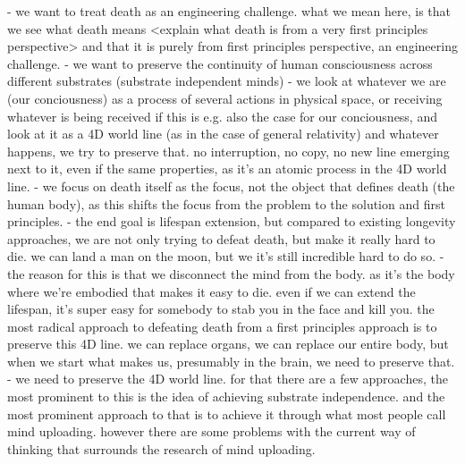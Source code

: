 \documentclass[10pt]{article}
\begin{document}
\begin{sloppypar}

  - we want to treat death as an engineering challenge. what we mean here, is that we see what death means <explain what death is from a very first principles perspective> and that it is purely from first principles perspective, an engineering challenge.
  - we want to preserve the continuity of human consciousness across different substrates (substrate independent minds)
  - we look at whatever we are (our conciousness) as a process of several actions in physical space, or receiving whatever is being received if this is e.g. also the case for our conciousness, and look at it as a 4D world line (as in the case of general relativity) and whatever happens, we try to preserve that. no interruption, no copy, no new line emerging next to it, even if the same properties, as it's an atomic process in the 4D world line.
  - we focus on death itself as the focus, not the object that defines death (the human body), as this shifts the focus from the problem to the solution and first principles.
  - the end goal is lifespan extension, but compared to existing longevity approaches, we are not only trying to defeat death, but make it really hard to die. we can land a man on the moon, but we it's still incredible hard to do so.
  - the reason for this is that we disconnect the mind from the body. as it's the body where we're embodied that makes it easy to die. even if we can extend the lifespan, it's super easy for somebody to stab you in the face and kill you. the most radical approach to defeating death from a first principles approach is to preserve this 4D line. we can replace organs, we can replace our entire body, but when we start what makes us, presumably in the brain, we need to preserve that.
  - we need to preserve the 4D world line. for that there are a few approaches, the most prominent to this is the idea of achieving substrate independence. and the most prominent approach to that is to achieve it through what most people call mind uploading. however there are some problems with the current way of thinking that surrounds the research of mind uploading.


\end{sloppypar}
\end{document}
